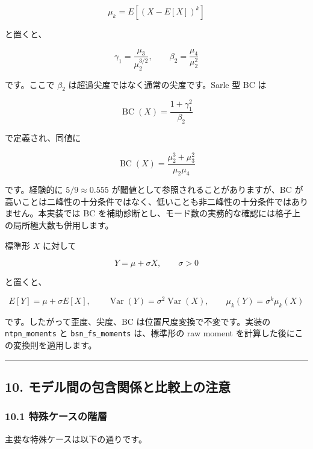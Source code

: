 \documentclass[
]{article}
\begin{document}
\[
\mu_k=E[(X-E[X])^k]
\]

と置くと、

\[
\gamma_1=\frac{\mu_3}{\mu_2^{3/2}},
\qquad
\beta_2=\frac{\mu_4}{\mu_2^2}
\]

です。ここで \(\beta_2\) は超過尖度ではなく通常の尖度です。Sarle 型 BC
は

\[
\operatorname{BC}(X)=\frac{1+\gamma_1^2}{\beta_2}
\]

で定義され、同値に

\[
\operatorname{BC}(X)=
\frac{\mu_2^3+\mu_3^2}{\mu_2\mu_4}
\]

です。経験的に \(5/9\approx0.555\)
が閾値として参照されることがありますが、BC
が高いことは二峰性の十分条件ではなく、低いことも非二峰性の十分条件ではありません。本実装では
BC
を補助診断とし、モード数の実務的な確認には格子上の局所極大数も併用します。

標準形 \(X\) に対して

\[
Y=\mu+\sigma X,\qquad \sigma>0
\]

と置くと、

\[
E[Y]=\mu+\sigma E[X],
\qquad
\operatorname{Var}(Y)=\sigma^2\operatorname{Var}(X),
\qquad
\mu_k(Y)=\sigma^k\mu_k(X)
\]

です。したがって歪度、尖度、BC は位置尺度変換で不変です。実装の
\texttt{ntpn\_moments} と \texttt{bsn\_fs\_moments} は、標準形の raw
moment を計算した後にこの変換則を適用します。

\begin{center}\rule{0.5\linewidth}{0.5pt}\end{center}

\hypertarget{ux30e2ux30c7ux30ebux9593ux306eux5305ux542bux95a2ux4fc2ux3068ux6bd4ux8f03ux4e0aux306eux6ce8ux610f}{%
\subsection{10.
モデル間の包含関係と比較上の注意}\label{ux30e2ux30c7ux30ebux9593ux306eux5305ux542bux95a2ux4fc2ux3068ux6bd4ux8f03ux4e0aux306eux6ce8ux610f}}

\hypertarget{ux7279ux6b8aux30b1ux30fcux30b9ux306eux968eux5c64}{%
\subsubsection{10.1
特殊ケースの階層}\label{ux7279ux6b8aux30b1ux30fcux30b9ux306eux968eux5c64}}

主要な特殊ケースは以下の通りです。
\end{document}
